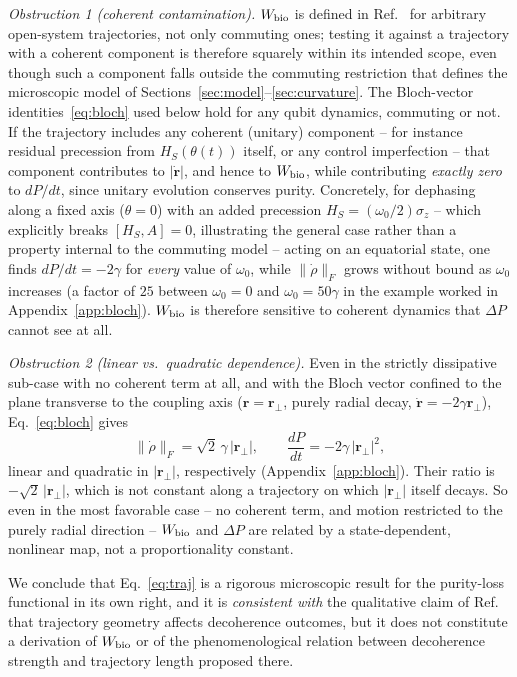 \documentclass[aps,pra,reprint,superscriptaddress,nofootinbib,longbibliography]{revtex4-2}
\newcommand{\Wbio}{W_{\rm bio}}
\begin{document}
\emph{Obstruction 1 (coherent contamination).} $\Wbio$ is defined in
Ref.~\cite{rodrigues2025} for arbitrary open-system trajectories, not
only commuting ones; testing it against a trajectory with a coherent
component is therefore squarely within its intended scope, even though
such a component falls outside the commuting restriction that defines
the microscopic model of Sections~\ref{sec:model}--\ref{sec:curvature}.
The Bloch-vector identities~\eqref{eq:bloch} used below hold for any
qubit dynamics, commuting or not. If the trajectory
includes any coherent (unitary) component -- for instance residual
precession from $H_S(\theta(t))$ itself, or any control imperfection
-- that component contributes to $|\dot{\mathbf r}|$, and hence to
$\Wbio$, while contributing \emph{exactly zero} to $dP/dt$, since
unitary evolution conserves purity. Concretely, for dephasing along a
fixed axis ($\theta=0$) with an added precession
$H_S=(\omega_0/2)\sigma_z$ -- which explicitly breaks
$[H_S,A]=0$, illustrating the general case rather than a property
internal to the commuting model -- acting on an equatorial state, one finds
$dP/dt=-2\gamma$ for \emph{every} value of $\omega_0$, while
$\|\dot\rho\|_F$ grows without bound as $\omega_0$ increases (a factor
of $25$ between $\omega_0=0$ and $\omega_0=50\gamma$ in the example
worked in Appendix~\ref{app:bloch}). $\Wbio$ is therefore sensitive to
coherent dynamics that $\Delta P$ cannot see at all.

\emph{Obstruction 2 (linear vs.\ quadratic dependence).} Even in the
strictly dissipative sub-case with no coherent term at all, and with
the Bloch vector confined to the plane transverse to the coupling axis
($\mathbf r=\mathbf r_\perp$, purely radial decay, $\dot{\mathbf
r}=-2\gamma\mathbf r_\perp$), Eq.~\eqref{eq:bloch} gives
\begin{equation}
\|\dot\rho\|_F = \sqrt2\,\gamma\,|\mathbf r_\perp|,
\qquad
\frac{dP}{dt} = -2\gamma\,|\mathbf r_\perp|^2 ,
\end{equation}
linear and quadratic in $|\mathbf r_\perp|$, respectively
(Appendix~\ref{app:bloch}). Their ratio is $-\sqrt2\,|\mathbf r_\perp|$,
which is not constant along a trajectory on which $|\mathbf r_\perp|$
itself decays. So even in the most favorable case -- no coherent
term, and motion restricted to the purely radial direction -- $\Wbio$
and $\Delta P$ are related by a state-dependent, nonlinear map, not a
proportionality constant.

We conclude that Eq.~\eqref{eq:traj} is a rigorous microscopic result
for the purity-loss functional in its own right, and it is
\emph{consistent with} the qualitative claim of
Ref.~\cite{rodrigues2025} that trajectory geometry affects decoherence
outcomes, but it does not constitute a derivation of $\Wbio$ or of the
phenomenological relation between decoherence strength and trajectory
length proposed there.
\end{document}
